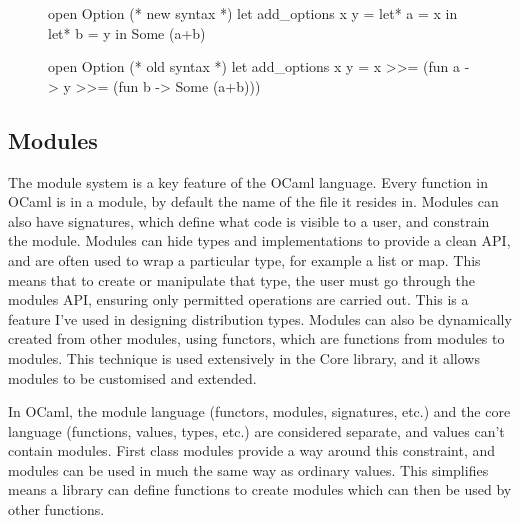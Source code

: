 \begin{figure}[!htb]
	\centering
	\begin{minipage}{0.45\textwidth}
		\centering
		\begin{ocamlcode-in}
			open Option
			(* new syntax *)
			let add_options x y = 
			  let* a = x in
			  let* b = y in
			  Some (a+b)
		\end{ocamlcode-in}
	\end{minipage}
	\begin{minipage}{0.45\textwidth}
		\centering
		\begin{ocamlcode-in}
			open Option
			(* old syntax *)
			let add_options x y = 
			  x >>= (fun a -> 
			    y >>= (fun b ->
			      Some (a+b)))
		\end{ocamlcode-in}
	\end{minipage}
\end{figure}
	
\subsection{Modules}
The module system is a key feature of the OCaml language. Every function in OCaml is in a module, by default the name of the file it resides in. Modules can also have signatures, which define what code is visible to a user, and constrain the module. Modules can hide types and implementations to provide a clean API, and are often used to wrap a particular type, for example a list or map. This means that to create or manipulate that type, the user must go through the modules API, ensuring only permitted operations are carried out. This is a feature I've used in designing distribution types. Modules can also be dynamically created from other modules, using functors, which are functions from modules to modules. This technique is used extensively in the Core library, and it allows modules to be customised and extended.
	
In OCaml, the module language (functors, modules, signatures, etc.) and the core language (functions, values, types, etc.) are considered separate, and values can't contain modules. First class modules provide a way around this constraint, and modules can be used in much the same way as ordinary values. This simplifies means a library can define functions to create modules which can then be used by other functions.
	
